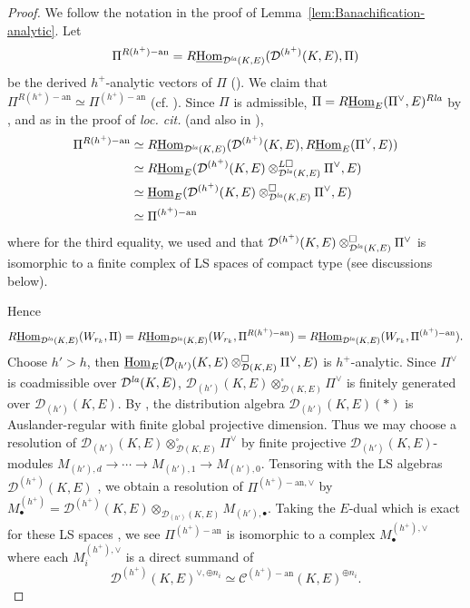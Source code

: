 \documentclass[a4paper,10pt]{amsart}
\theoremstyle{remark}
\theoremstyle{definition}
\theoremstyle{plain}
\numberwithin{equation}{section}
\newcommand{\calC}{{\mathcal C}}
\newcommand{\calD}{{\mathcal D}}
\newcommand{\Hom}{{\rm Hom}}
\newcommand{\uHom}{\underline{\Hom}}
\newcommand{\la}{{\it la}}
\begin{document}
\begin{proof}
	We follow the notation in the proof of Lemma~\ref{lem:Banachification-analytic}. Let 
	\[\Pi^{R(h^+)-\mathrm{an}}=R\underline{\Hom}_{\calD^{\la}(K,E)}(\calD^{(h^+)}(K,E),\Pi)\] be the derived $h^+$-analytic vectors of $\Pi$ (\cite[Def. 4.29, Thm. 4.36]{rodrigues2022solid}). We claim that $\Pi^{R(h^+)-\mathrm{an}}\simeq \Pi^{(h^+)-\mathrm{an}}$ (cf. \cite[Prop.~3.27]{agrawal2024resolutions}). Since $\Pi$ is admissible, $\Pi=R\uHom_E(\Pi^{\vee},E)^{R\la}$ by \cite[Lem. 4.2.6]{JC23}, and as in the proof of \textit{loc. cit.} (and also in \cite[Prop. 4.48]{rodrigues2022solid}), 
	\begin{align*}
		\Pi^{R(h^+)-\mathrm{an}}
		&\simeq R\underline{\Hom}_{\calD^{\la}(K,E)}(\calD^{(h^+)}(K,E),R\underline{\Hom}_{E}(\Pi^{\vee},E))\\
		&\simeq R\underline{\Hom}_{E}(\calD^{(h^+)}(K,E)\otimes_{\calD^{\la}(K,E)}^{L\square}\Pi^{\vee},E)\\
		&\simeq \underline{\Hom}_{E}(\calD^{(h^+)}(K,E)\otimes_{\calD^{\la}(K,E)}^{\square}\Pi^{\vee},E)\\
		&\simeq \Pi^{(h^+)-\mathrm{an}}
	\end{align*}
	where for the third equality, we used \cite[Cor. 4.2.4]{JC23} and that $\calD^{(h^+)}(K,E)\otimes_{\calD^{\la}(K,E)}^{\square}\Pi^{\vee}$ is isomorphic to a finite complex of LS spaces of compact type (see discussions below).
	
	Hence
	\[R\underline{\Hom}_{\calD^{\la}(K,E)}(W_{r_k},\Pi)=R\underline{\Hom}_{\calD^{\la}(K,E)}(W_{r_k},\Pi^{R(h^+)-\mathrm{an}})=R\underline{\Hom}_{\calD^{\la}(K,E)}(W_{r_k},\Pi^{(h^+)-\mathrm{an}}).\] 
	Choose $h'>h$, then $\uHom_E(\calD_{(h')}(K,E)\otimes_{\calD(K,E)}^{\square}\Pi^{\vee},E)$ is $h^+$-analytic. Since $\Pi^{\vee}$ is coadmissible over $\calD^{\la}(K,E)$, $\calD_{(h')}(K,E)\otimes_{\calD(K,E)}^{\square}\Pi^{\vee}$ is finitely generated over $\calD_{(h')}(K,E)$. By \cite[Thm.~8.9]{ST03}, the distribution algebra $\calD_{(h')}(K,E)(*)$ is Auslander-regular with finite global projective dimension. Thus we may choose a resolution of $\calD_{(h')}(K,E)\otimes_{\calD(K,E)}^{\square}\Pi^{\vee}$ by finite projective $\calD_{(h')}(K,E)$-modules $M_{(h'),d}\rightarrow \cdots \rightarrow M_{(h'),1}\rightarrow M_{(h'),0}$. Tensoring with the LS algebras $\calD^{(h^+)}(K,E)$ \cite[Thm.~4.45]{rodrigues2022solid}, we obtain a resolution of $\Pi^{(h^+)-\mathrm{an},\vee}$ by $M^{(h^+)}_{\bullet}=\calD^{(h^+)}(K,E)\otimes_{\calD_{(h')}(K,E)} M_{(h'),\bullet}$. Taking the $E$-dual which is exact for these LS spaces \cite[Thm. 3.40]{rodrigues2022solid}, we see $\Pi^{(h^+)-\mathrm{an}}$ is isomorphic to a complex $M^{(h^+),\vee}_{\bullet}$ where each $M^{(h^+),\vee}_{i}$ is a direct summand of 
	\[\calD^{(h^+)}(K,E)^{\vee,\oplus n_i}\simeq \calC^{(h^+)-\mathrm{an}}(K,E)^{\oplus n_i}.\]
	

\end{proof}
\end{document}
